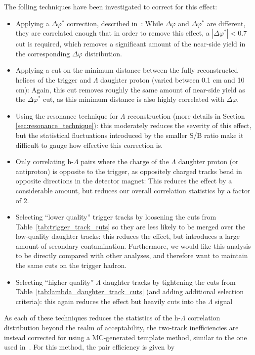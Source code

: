 The folling techniques have been investigated to correct for this effect:
%
\begin{itemize}
	\item Applying a $\Delta\varphi^{*}$ correction, described in~\cite{DphiStar}: While $\Delta\varphi$ and $\Delta\varphi^{*}$ are different, they are correlated enough that in order to remove this effect, a $|\Delta\varphi^{*}| < 0.7$ cut is required, which removes a significant amount of the near-side yield in the corresponding $\Delta\varphi$ distribution.
	\item Applying a cut on the minimum distance between the fully reconstructed helices of the trigger and $\Lambda$ daughter proton (varied between 0.1 cm and 10 cm): Again, this cut removes roughly the same amount of near-side yield as the $\Delta\varphi^{*}$ cut, as this minimum distance is also highly correlated with $\Delta\varphi$.
	\item Using the resonance technique for $\Lambda$ reconstruction (more details in Section \ref{sec:resonance_technique}): this moderately reduces the severity of this effect, but the statistical fluctuations introduced by the smaller S/B ratio make it difficult to gauge how effective this correction is.
	\item Only correlating h-$\Lambda$ pairs where the charge of the $\Lambda$ daughter proton (or antiproton) is opposite to the trigger, as oppositely charged tracks bend in opposite directions in the detector magnet: This reduces the effect by a considerable amount, but reduces our overall correlation statistics by a factor of 2.
	\item Selecting ``lower quality'' trigger tracks by loosening the cuts from Table~\ref{tab:trigger_track_cuts} so they are less likely to be merged over the low-quality daughter tracks: this reduces the effect, but introduces a large amount of secondary contamination. Furthermore, we would like this analysis to be directly compared with other analyses, and therefore want to maintain the same cuts on the trigger hadron.
	\item Selecting ``higher quality'' $\Lambda$ daughter tracks by tightening the cuts from Table~\ref{tab:lambda_daughter_track_cuts} (and adding additional selection criteria): this again reduces the effect but heavily cuts into the $\Lambda$ signal
\end{itemize}
%
As each of these techniques reduces the statistics of the h-$\Lambda$ correlation distribution beyond the realm of acceptability, the two-track inefficiencies are instead corrected for using a MC-generated template method, similar to the one used in~\cite{TwoTrack2}. For this method, the pair efficiency is given by
